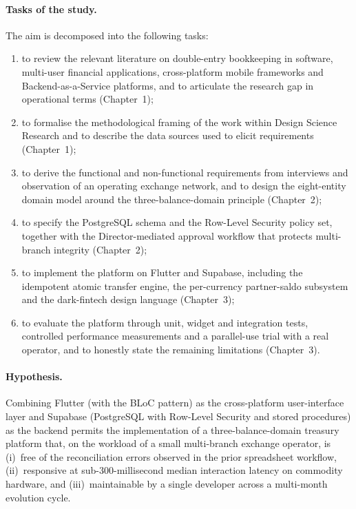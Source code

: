 \paragraph{Tasks of the study.}
The aim is decomposed into the following tasks:
\begin{enumerate}
  \item to review the relevant literature on double-entry bookkeeping in software, multi-user financial applications, cross-platform mobile frameworks and Backend-as-a-Service platforms, and to articulate the research gap in operational terms (Chapter~1);
  \item to formalise the methodological framing of the work within Design Science Research and to describe the data sources used to elicit requirements (Chapter~1);
  \item to derive the functional and non-functional requirements from interviews and observation of an operating exchange network, and to design the eight-entity domain model around the three-balance-domain principle (Chapter~2);
  \item to specify the PostgreSQL schema and the Row-Level Security policy set, together with the Director-mediated approval workflow that protects multi-branch integrity (Chapter~2);
  \item to implement the platform on Flutter and Supabase, including the idempotent atomic transfer engine, the per-currency partner-saldo subsystem and the dark-fintech design language (Chapter~3);
  \item to evaluate the platform through unit, widget and integration tests, controlled performance measurements and a parallel-use trial with a real operator, and to honestly state the remaining limitations (Chapter~3).
\end{enumerate}

\paragraph{Hypothesis.}
Combining Flutter (with the BLoC pattern) as the cross-platform user-interface layer and Supabase (PostgreSQL with Row-Level Security and stored procedures) as the backend permits the implementation of a three-balance-domain treasury platform that, on the workload of a small multi-branch exchange operator, is (i)~free of the reconciliation errors observed in the prior spreadsheet workflow, (ii)~responsive at sub-300-millisecond median interaction latency on commodity hardware, and (iii)~maintainable by a single developer across a multi-month evolution cycle.

